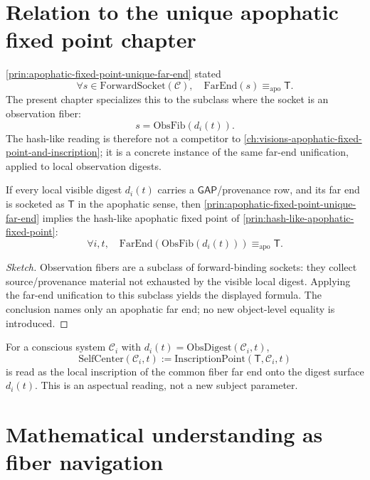 \section{Relation to the unique apophatic fixed point chapter}
\label{sec:hash-like-relation-to-previous}

\autoref{prin:apophatic-fixed-point-unique-far-end} stated
$$
\forall s \in \mathrm{ForwardSocket}(\mathcal{C}),\quad \mathrm{FarEnd}(s) \equiv_{\mathrm{apo}} \mathsf{T}.
$$
The present chapter specializes this to the subclass where the socket is an observation fiber:
$$
s = \mathrm{ObsFib}(d_i(t)).
$$
The hash-like reading is therefore not a competitor to \autoref{ch:visions-apophatic-fixed-point-and-inscription}; it is a concrete instance of the same far-end unification, applied to local observation digests.

\begin{theorem}
\label{thm:hash-like-specialization}
If every local visible digest $d_i(t)$ carries a $\mathsf{GAP}$/provenance row, and its far end is socketed as $\mathsf{T}$ in the apophatic sense, then \autoref{prin:apophatic-fixed-point-unique-far-end} implies the hash-like apophatic fixed point of \autoref{prin:hash-like-apophatic-fixed-point}:
$$
\forall i, t,\quad \mathrm{FarEnd}(\mathrm{ObsFib}(d_i(t))) \equiv_{\mathrm{apo}} \mathsf{T}.
$$
\end{theorem}

\begin{proof}[Sketch]
Observation fibers are a subclass of forward-binding sockets: they collect source/provenance material not exhausted by the visible local digest. Applying the far-end unification to this subclass yields the displayed formula. The conclusion names only an apophatic far end; no new object-level equality is introduced.
\end{proof}

\begin{corollary}
\label{cor:hash-like-self-center-on-digest}
For a conscious system $\mathcal{C}_i$ with $d_i(t) = \mathrm{ObsDigest}(\mathcal{C}_i, t)$,
$$
\mathrm{SelfCenter}(\mathcal{C}_i, t) := \mathrm{InscriptionPoint}(\mathsf{T}, \mathcal{C}_i, t)
$$
is read as the local inscription of the common fiber far end onto the digest surface $d_i(t)$. This is an aspectual reading, not a new subject parameter.
\end{corollary}

\section{Mathematical understanding as fiber navigation}
\label{sec:hash-like-mathematical-understanding}


